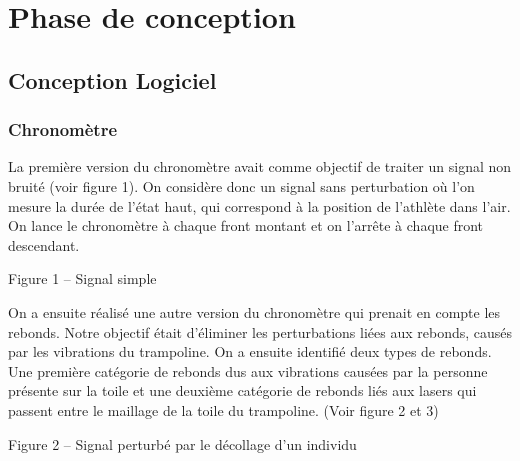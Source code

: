 \section{Phase de conception}

\subsection{Conception Logiciel}
\subsubsection{Chronomètre}
La première version du chronomètre avait comme objectif de traiter un signal non bruité (voir figure 1). On considère donc un signal sans perturbation où l’on mesure la durée de l’état haut, qui correspond à la position de l’athlète dans l’air. On lance le chronomètre à chaque front montant et on l’arrête à chaque front descendant.

\begin{center}

Figure 1 – Signal simple

\end{center}

On a ensuite réalisé une autre version du chronomètre qui prenait en compte les rebonds. Notre objectif était d’éliminer les perturbations liées aux rebonds, causés par les vibrations du trampoline. On a ensuite identifié deux types de rebonds. Une première catégorie de rebonds dus aux vibrations causées par la personne présente sur la toile et une deuxième catégorie de rebonds liés aux lasers qui passent entre le maillage de la toile du trampoline. (Voir figure 2 et 3)

\begin{center}
  
Figure 2 – Signal perturbé par le décollage d’un individu
\end{center}

